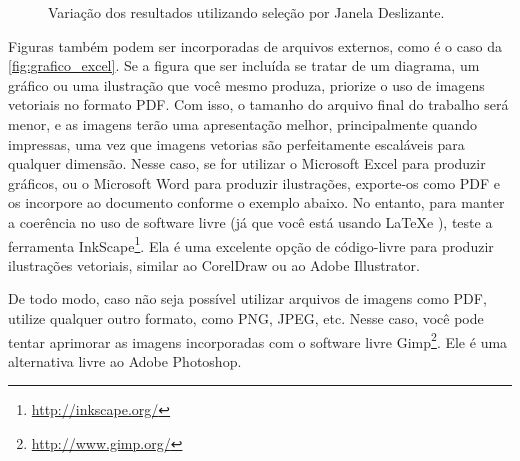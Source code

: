 \begin{figure}[!htb]
  \caption{Variação dos resultados utilizando seleção por Janela Deslizante.}
  \label{fig:grafico_dados}
  \begin{center}
\end{center}
\end{figure}


Figuras também podem ser incorporadas de arquivos externos, como é o caso da \autoref{fig:grafico_excel}.
  Se a figura que ser incluída se tratar de um diagrama, um gráfico ou uma ilustração que você mesmo produza, priorize o uso de imagens vetoriais no formato PDF.
  Com isso, o tamanho do arquivo final do trabalho será menor, e as imagens terão uma apresentação melhor, principalmente quando impressas, uma vez que imagens vetorias são perfeitamente escaláveis para qualquer dimensão.
  Nesse caso, se for utilizar o Microsoft Excel para produzir gráficos, ou o Microsoft Word para produzir ilustrações, exporte-os como PDF e os incorpore ao documento conforme o exemplo abaixo.
  No entanto, para manter a coerência no uso de software livre (já que você está usando \LaTeX e \abnTeX), teste a ferramenta \textsf{InkScape}\footnote{\url{http://inkscape.org/}}.
  Ela é uma excelente opção de código-livre para produzir ilustrações vetoriais, similar ao CorelDraw ou ao Adobe Illustrator.

De todo modo, caso não seja possível utilizar arquivos de imagens como PDF, utilize qualquer outro formato, como PNG, JPEG, etc.
  Nesse caso, você pode tentar aprimorar as imagens incorporadas com o software livre \textsf{Gimp}\footnote{\url{http://www.gimp.org/}}.
  Ele é uma alternativa livre ao Adobe Photoshop.

